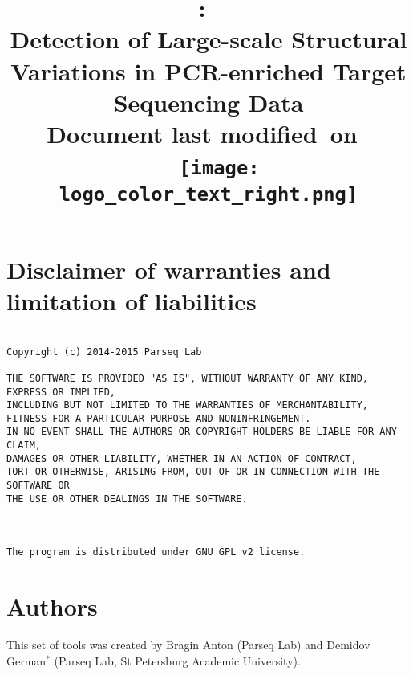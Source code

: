 \documentclass{article}
\title{
\vspace{2in}
\textmd{\LARGE{\textbf{\hmwkClass:\ \hmwkTitle}}}\\
\vspace{0.1in}\Large{Detection of Large-scale Structural Variations in PCR-enriched Target Sequencing Data}\\
\normalsize\vspace{0.1in}\small{Document last modified\ on\ \hmwkDueDate}\\
\vspace{0.1in}\small{{\hmwkClassInstructor\ \hmwkClassTime}}
\vspace{3in}
\vfill
\texttt{[image: logo\_color\_text\_right.png]}
}
\author{\textbf{\hmwkAuthorName}}
\date{} %
\begin{document}
\clearpage\maketitle
\thispagestyle{empty}



\newpage
\tableofcontents
\newpage



\section{Disclaimer of warranties and limitation of liabilities}

\begin{small}
\begin{verbatim}

Copyright (c) 2014-2015 Parseq Lab

THE SOFTWARE IS PROVIDED "AS IS", WITHOUT WARRANTY OF ANY KIND, EXPRESS OR IMPLIED, 
INCLUDING BUT NOT LIMITED TO THE WARRANTIES OF MERCHANTABILITY, 
FITNESS FOR A PARTICULAR PURPOSE AND NONINFRINGEMENT. 
IN NO EVENT SHALL THE AUTHORS OR COPYRIGHT HOLDERS BE LIABLE FOR ANY CLAIM, 
DAMAGES OR OTHER LIABILITY, WHETHER IN AN ACTION OF CONTRACT, 
TORT OR OTHERWISE, ARISING FROM, OUT OF OR IN CONNECTION WITH THE SOFTWARE OR
THE USE OR OTHER DEALINGS IN THE SOFTWARE.



The program is distributed under GNU GPL v2 license.
\end{verbatim}
\end{small}

\newpage


\section{Authors}

This set of tools was created by Bragin Anton (Parseq Lab) and Demidov German$^*$ (Parseq Lab, St Petersburg Academic University).
\end{document}
